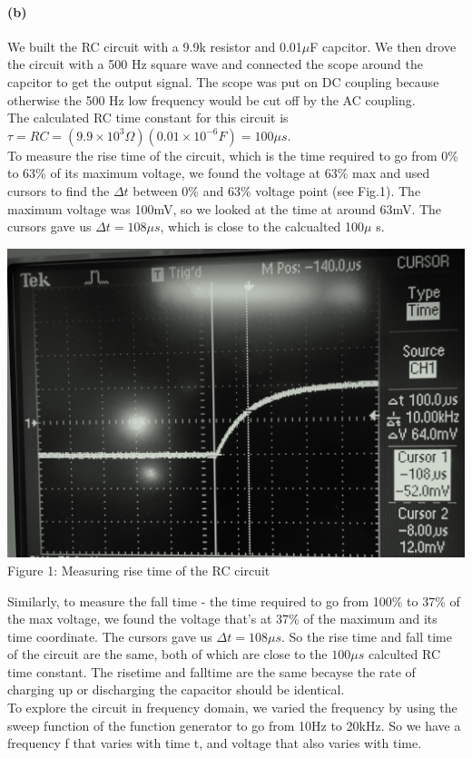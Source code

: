 \documentclass[]{article}
\begin{document}
	\paragraph{ (b)} 	
	We built the RC circuit with a 9.9k resistor and 0.01$\mu$F capcitor. We then drove the circuit with a 500 Hz square wave and connected the scope around the capcitor to get the output signal. The scope was put on DC coupling because otherwise the 500 Hz low frequency would be cut off by the AC coupling.\\
	 The calculated RC time constant for this circuit is $\tau =RC=(9.9\times10^{3}\Omega)(0.01\times10^{-6}F)=100\mu s$.\\ To measure the rise time of the circuit, which is the time required to go from 0\% to 63\% of its maximum voltage, we found the voltage at 63\% max and used cursors to find the $\Delta t$ between 0\% and  63\% voltage point (see Fig.1). The maximum voltage was 100mV, so we looked at the time at around 63mV.  The cursors gave us $\Delta t=108 \mu s$, which is close to the calcualted 100$\mu$ s.\\
	 	\begin{center}
	 		\includegraphics[scale=0.08]{lab2_risetime}\\
	 		Figure 1: Measuring rise time of the RC circuit
	 	\end{center}
	 	Similarly, to measure the fall time - the time required to go from 100\% to 37\% of the max voltage, we found the voltage that's at 37\% of the maximum and its time coordinate. The cursors gave us $\Delta t=108 \mu s$. So the rise time and fall time of the circuit are the same, both of which are close to the $100\mu s $ calculted RC time constant. The risetime and falltime are the same becayse the rate of charging up or discharging the capacitor should be identical. \\
	 	To explore the circuit in frequency domain, we varied the frequency by using the sweep function of the function generator to go from 10Hz to 20kHz. So we have a frequency f that varies with time t, and voltage that also varies with time. 
	
\end{document}
